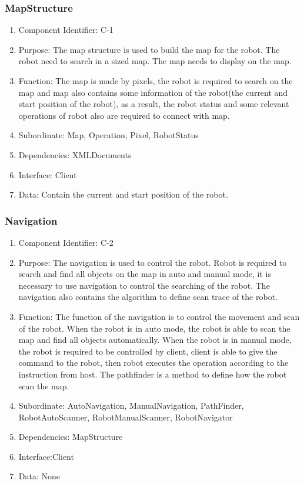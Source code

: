 \documentclass[11pt, a4paper]{report}
\begin{document}
\subsubsection{MapStructure}
\begin{enumerate}
\item Component Identifier: C-1
\item Purpose: The map structure is used to build the map for the robot. The robot need to search in a sized map. The map needs to display on the map. 
\item Function: The map is made by pixels, the robot is required to search on the map and map also contains some information of the robot(the current and start position of the robot), as a result, the robot status and some relevant operations of robot also are required to connect with map.
\item Subordinate: Map, Operation, Pixel, RobotStatus
\item Dependencies: XMLDocuments
\item Interface: Client
\item Data: Contain the current and start position of the robot. 
\end{enumerate}

\subsubsection{Navigation}
\begin{enumerate}
\item Component Identifier: C-2
\item Purpose: The navigation is used to control the robot. Robot is required to search and find all objects on the map in auto and manual mode, it is necessary to use navigation to control the searching of the robot. The navigation also contains the algorithm to define scan trace of the robot. 
\item Function: The function of the navigation is to control the movement and scan of the robot. When the robot is in auto mode, the robot is able to scan the map and find all objects automatically. When the robot is in manual mode, the robot is required to be controlled by client, client is able to give the command to the robot, then robot executes the operation according to the instruction from host. The pathfinder is a method to define how the robot scan the map. 
\item Subordinate: AutoNavigation, ManualNavigation, PathFinder, RobotAutoScanner, RobotManualScanner, RobotNavigator
\item Dependencies: MapStructure
\item Interface:Client
\item Data: None
\end{enumerate}
\end{document}
